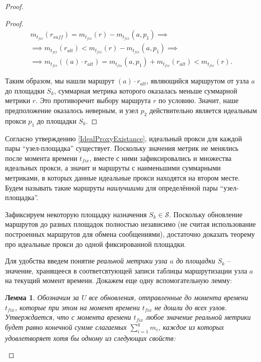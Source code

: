 \documentclass{article}
\theoremstyle{plain}
\theoremstyle{plain}
\theoremstyle{plain}
\newtheorem{lemma}{Лемма}[section]
\theoremstyle{plain}
\theoremstyle{definition}
\theoremstyle{remark}
\theoremstyle{plain}
\begin{document}
\begin{proof}
\begin{proof}
        \begin{equation*}
        \begin{aligned}
            m_{t_{fix}}(r_{suff}) = m_{t_{fix}}(r) - m_{t_{fix}}(a, p_1) \implies \\
            \implies m_{t_{fix}}(r_{alt}) < m_{t_{fix}}(r) - m_{t_{fix}}(a, p_1) \implies \\
            \implies m_{t_{fix}}((a) \cdot r_{alt}) = m_{t_{fix}}(a, p_1) + m_{t_{fix}}(r_{alt}) < m_{t_{fix}}(r).
        \end{aligned}
        \end{equation*}
        
        Таким образом, мы нашли маршрут $(a) \cdot r_{alt}$, являющийся маршрутом от узла $a$ до площадки $S_k$, суммарная метрика которого оказалась меньше суммарной метрики $r$. Это противоречит выбору маршрута $r$ по условию. Значит, наше предположение оказалось неверным, и узел $p_2$ действительно является идеальным прокси $p_1$ до площадки $S_k$.
    \end{proof}
    
    Согласно утверждению \ref{IdealProxyExistance}, идеальный прокси для каждой пары \enquote{узел-площадка} существует. Поскольку значения метрик не менялись после момента времени $t_{fix}$, вместе с ними зафиксировались и множества идеальных прокси, а значит и маршруты с наименьшими суммарными метриками, в которых данные идеальные прокси находятся на втором месте. Будем называть такие маршруты \textit{наилучшими} для определённой пары \enquote{узел-площадка}.
    
    Зафиксируем некоторую площадку назначения $S_k \in \mathcal{S}$. Поскольку обновление маршрутов до разных площадок полностью независимо (не считая использование построенных маршрутов для обмена сообщениями), достаточно доказать теорему про идеальные прокси до одной фиксированной площадки.
    
    Для удобства введем понятие \textit{реальной метрики узла $a$ до площадки $S_k$} -- значение, хранящееся в соответсвтующей записи таблицы маршрутизации узла $a$ на текущий момент времени. Докажем еще одну вспомогательную лемму:
    
    \begin{lemma}
    \label{PossibleMetricValue}
        Обозначим за $U$ все обновления, отправленные до момента времени $t_{fix}$, которые при этом на момент времени $t_{fix}$ не дошли до всех узлов. Утверждается, что с момента времени $t_{fix}$ любое значение реальной метрики будет равно конечной сумме слагаемых $\displaystyle \sum_{i = 1}^q m_i$, каждое из которых удовлетворяет хотя бы одному из следующих свойств:
        

\end{lemma}
\end{proof}
\end{document}
